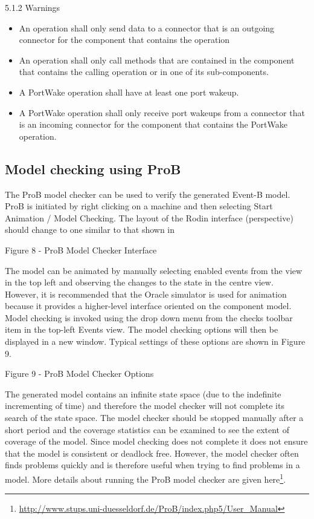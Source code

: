5.1.2	Warnings

\begin{itemize}
\item An operation shall only send data to a connector that is an outgoing connector for the component that contains the operation
\item An operation shall only call methods that are contained in the component that contains the calling operation or in one of its sub-components.
\item A PortWake operation shall have at least one port wakeup.
\item A PortWake operation shall only receive port wakeups from a connector that is an incoming connector for the component that contains the PortWake operation.
\end{itemize}


\subsection{Model checking using ProB}
The ProB model checker can be used to verify the generated Event-B model. ProB is initiated by right clicking on a machine and then selecting Start Animation / Model Checking. The layout of the Rodin interface (perspective) should change to one similar to that shown in 
 

Figure 8 - ProB Model Checker Interface


The model can be animated by manually selecting enabled events from the view in the top left and observing the changes to the state in the centre view. However, it is recommended that the Oracle simulator is used for animation because it provides a higher-level interface oriented on the component model.
Model checking is invoked using the drop down menu from the checks toolbar item in the top-left Events view. The model checking options will then be displayed in a new window. Typical settings of these options are shown in Figure 9.

 
Figure 9 - ProB Model Checker Options


The generated model contains an infinite state space (due to the indefinite incrementing of time) and therefore the model checker will not complete its search of the state space. The model checker should be stopped manually after a short period and the coverage statistics can be examined to see the extent of coverage of the model. Since model checking does not complete it does not ensure that the model is consistent or deadlock free. However, the model checker often finds problems quickly and is therefore useful when trying to find problems in a model.
More details about running the ProB model checker are given here\footnote{\url{http://www.stups.uni-duesseldorf.de/ProB/index.php5/User_Manual}}.


